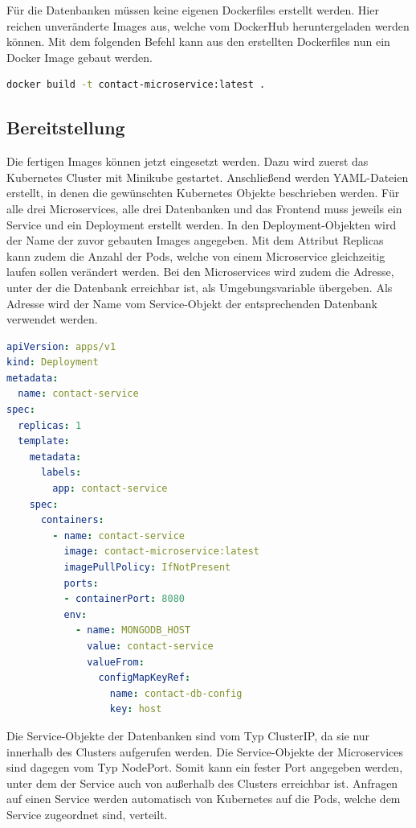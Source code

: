 Für die Datenbanken müssen keine eigenen Dockerfiles erstellt werden. Hier reichen unveränderte Images aus, welche vom DockerHub heruntergeladen werden können. Mit dem folgenden Befehl kann aus den erstellten Dockerfiles nun ein Docker Image gebaut werden.

\begin{lstlisting}[language=bash, caption=Docker-Befehl für das Bauen eines Images, captionpos=b]
docker build -t contact-microservice:latest .
\end{lstlisting}

\subsection{Bereitstellung}

Die fertigen Images können jetzt eingesetzt werden. Dazu wird zuerst das Kubernetes Cluster mit Minikube gestartet. Anschließend werden YAML-Dateien erstellt, in denen die gewünschten Kubernetes Objekte beschrieben werden. Für alle drei Microservices, alle drei Datenbanken und das Frontend muss jeweils ein Service und ein Deployment erstellt werden. In den Deployment-Objekten wird der Name der zuvor gebauten Images angegeben. Mit dem Attribut Replicas kann zudem die Anzahl der Pods, welche von einem Microservice gleichzeitig laufen sollen verändert werden. Bei den Microservices wird zudem die Adresse, unter der die Datenbank erreichbar ist, als Umgebungsvariable übergeben. Als Adresse wird der Name vom Service-Objekt der entsprechenden Datenbank verwendet werden.

\begin{lstlisting}[language=YAML, caption=Deployment-Objekt vom Kontakt-Microservice]
apiVersion: apps/v1
kind: Deployment
metadata:
  name: contact-service
spec:
  replicas: 1
  template:
    metadata:
      labels:
        app: contact-service
    spec:
      containers:
        - name: contact-service
          image: contact-microservice:latest
          imagePullPolicy: IfNotPresent
          ports:
          - containerPort: 8080
          env:
            - name: MONGODB_HOST
              value: contact-service
              valueFrom:
                configMapKeyRef:
                  name: contact-db-config  
                  key: host
\end{lstlisting}

Die Service-Objekte der Datenbanken sind vom Typ ClusterIP, da sie nur innerhalb des Clusters aufgerufen werden.
Die Service-Objekte der Microservices sind dagegen vom Typ NodePort. Somit kann ein fester Port angegeben werden, unter dem der Service auch von außerhalb des Clusters erreichbar ist. Anfragen auf einen Service werden automatisch von Kubernetes auf die Pods, welche dem Service zugeordnet sind, verteilt. 

